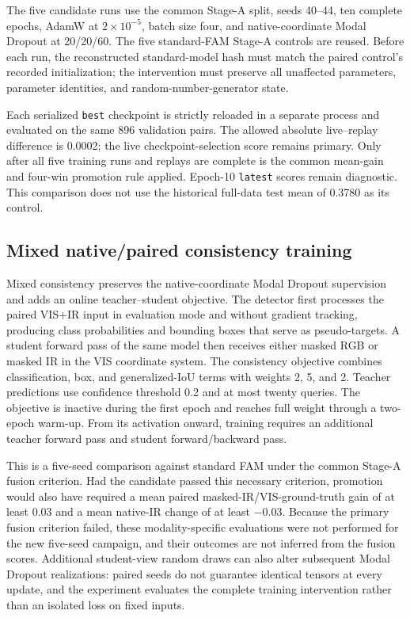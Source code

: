 The five candidate runs use the common Stage-A split, seeds 40--44, ten complete
epochs, AdamW at \(2\times10^{-5}\), batch size four, and native-coordinate
Modal Dropout at 20/20/60. The five standard-FAM Stage-A controls are reused.
Before each run, the reconstructed standard-model hash must match the paired
control's recorded initialization; the intervention must preserve all
unaffected parameters, parameter identities, and random-number-generator
state.

Each serialized \texttt{best} checkpoint is strictly reloaded in a separate
process and evaluated on the same 896 validation pairs. The allowed absolute
live--replay \mapfifty{} difference is 0.0002; the live checkpoint-selection
score remains primary. Only after all five training runs and replays are
complete is the common mean-gain and four-win promotion rule applied.
Epoch-10 \texttt{latest} scores remain diagnostic. This comparison does not
use the historical full-data test mean of 0.3780 as its control.

\subsection{Mixed native/paired consistency training}

Mixed consistency preserves the native-coordinate Modal Dropout supervision
and adds an online teacher--student objective. The detector first processes
the paired VIS+IR input in evaluation mode and without gradient tracking,
producing class probabilities and bounding boxes that serve as pseudo-targets.
A student forward pass of the same model then receives either masked RGB or
masked IR in the VIS coordinate system. The consistency objective combines
classification, box, and generalized-IoU terms with weights 2, 5, and 2.
Teacher predictions use confidence threshold 0.2 and at most twenty queries.
The objective is inactive during the first epoch and reaches full weight
through a two-epoch warm-up. From its activation onward, training requires
an additional teacher forward pass and student forward/backward pass.

This is a five-seed comparison against standard FAM under the common Stage-A
fusion criterion. Had the candidate passed this necessary criterion, promotion
would also have required a mean paired masked-IR/VIS-ground-truth gain of at
least 0.03 and a mean native-IR change of at least \(-0.03\). Because the
primary fusion criterion failed, these modality-specific evaluations were not
performed for the new five-seed campaign, and their outcomes are not inferred
from the fusion scores. Additional student-view random draws can also alter
subsequent Modal Dropout realizations: paired seeds do not guarantee identical
tensors at every update, and the experiment evaluates the complete training
intervention rather than an isolated loss on fixed inputs.

